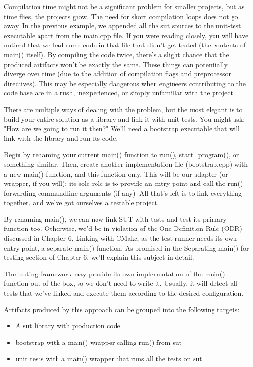 Compilation time might not be a significant problem for smaller projects, but as time flies, the projects grow. The need for short compilation loops does not go away. In the previous example, we appended all the sut sources to the unit-test executable apart from the main.cpp file. If you were reading closely, you will have noticed that we had some code in that file that didn't get tested (the contents of main() itself). By compiling the code twice, there's a slight chance that the produced artifacts won't be exactly the same. These things can potentially diverge over time (due to the addition of compilation flags and preprocessor directives). This may be especially dangerous when engineers contributing to the code base are in a rush, inexperienced, or simply unfamiliar with the project.

There are multiple ways of dealing with the problem, but the most elegant is to build your entire solution as a library and link it with unit tests. You might ask: "How are we going to run it then?" We'll need a bootstrap executable that will link with the library and run its code.

Begin by renaming your current main() function to run(), start\_program(), or something similar. Then, create another implementation file (bootstrap.cpp) with a new main() function, and this function only. This will be our adapter (or wrapper, if you will): its sole role is to provide an entry point and call the run() forwarding commandline arguments (if any). All that's left is to link everything together, and we've got ourselves a testable project.

By renaming main(), we can now link SUT with tests and test its primary function too. Otherwise, we'd be in violation of the One Definition Rule (ODR) discussed in Chapter 6, Linking with CMake, as the test runner needs its own entry point, a separate main() function. As promised in the Separating main() for testing section of Chapter 6, we'll explain this subject in detail.

The testing framework may provide its own implementation of the main() function out of the box, so we don't need to write it. Usually, it will detect all tests that we've linked and execute them according to the desired configuration.

Artifacts produced by this approach can be grouped into the following targets:

\begin{itemize}
\item 
A sut library with production code

\item 
bootstrap with a main() wrapper calling run() from sut

\item 
unit tests with a main() wrapper that runs all the tests on sut
\end{itemize}

